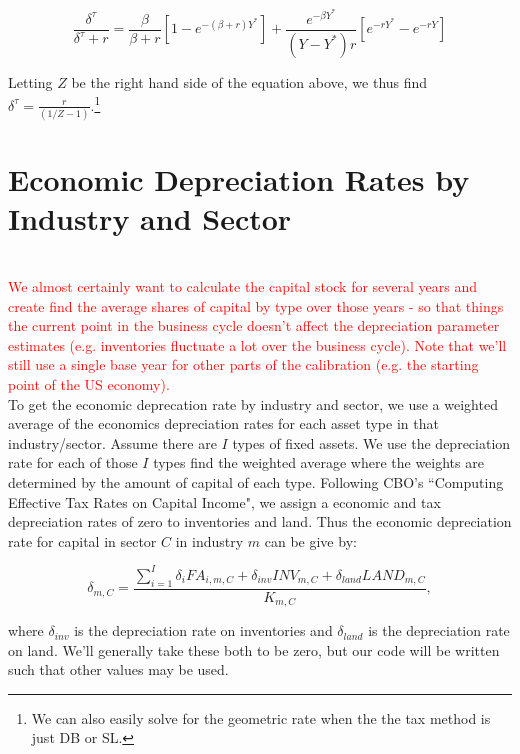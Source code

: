 \documentclass[article,11pt,letterpaper,fleqn]{article}
\theoremstyle{definition}
\numberwithin{equation}{section}
\begin{document}
\begin{equation}
\frac{\delta^{\tau}}{\delta^{\tau}+r}=\frac{\beta}{\beta+r}\left[1-e^{-(\beta+r)Y^{*}}\right]+\frac{e^{-\beta Y^{*}}}{(Y-Y^{*})r}\left[e^{-rY^{*}}-e^{-rY}\right]
\end{equation}

\noindent\noindent Letting $Z$ be the right hand side of the equation above, we thus find $\delta^{\tau}=\frac{r}{(1/Z-1)}$.\footnote{We can also easily solve for the geometric rate when the the tax method is just DB or SL.}

\section{Economic Depreciation Rates by Industry and Sector}
\label{sec:econ_rates_sector}

\ \\
\textcolor{red}{We almost certainly want to calculate the capital stock for several years and create find the average shares of capital by type over those years - so that things the current point in the business cycle doesn't affect the depreciation parameter estimates (e.g. inventories fluctuate a lot over the business cycle).  Note that we'll still use a single base year for other parts of the calibration (e.g. the starting point of the US economy).}
\ \\

To get the economic deprecation rate by industry and sector, we use a weighted average of the economics depreciation rates for each asset type in that industry/sector.  Assume there are $I$ types of fixed assets.  We use the depreciation rate for each of those $I$ types find the weighted average where the weights are determined by the amount of capital of each type.  Following CBO's ``Computing Effective Tax Rates on Capital Income", we assign a economic and tax depreciation rates of zero to inventories and land. Thus the economic depreciation rate for capital in sector $C$ in industry $m$ can be give by:

\begin{equation}
\label{eqn:econ_deprec}
\delta_{m,C}=\frac{\sum_{i=1}^{I}\delta_{i}{FA}_{i,m,C}+\delta_{inv}{INV}_{m,C}+\delta_{land}{LAND}_{m,C}}{K_{m,C}},
\end{equation}

\noindent\noindent where $\delta_{inv}$ is the depreciation rate on inventories and $\delta_{land}$ is the depreciation rate on land.  We'll generally take these both to be zero, but our code will be written such that other values may be used. 
\end{document}
